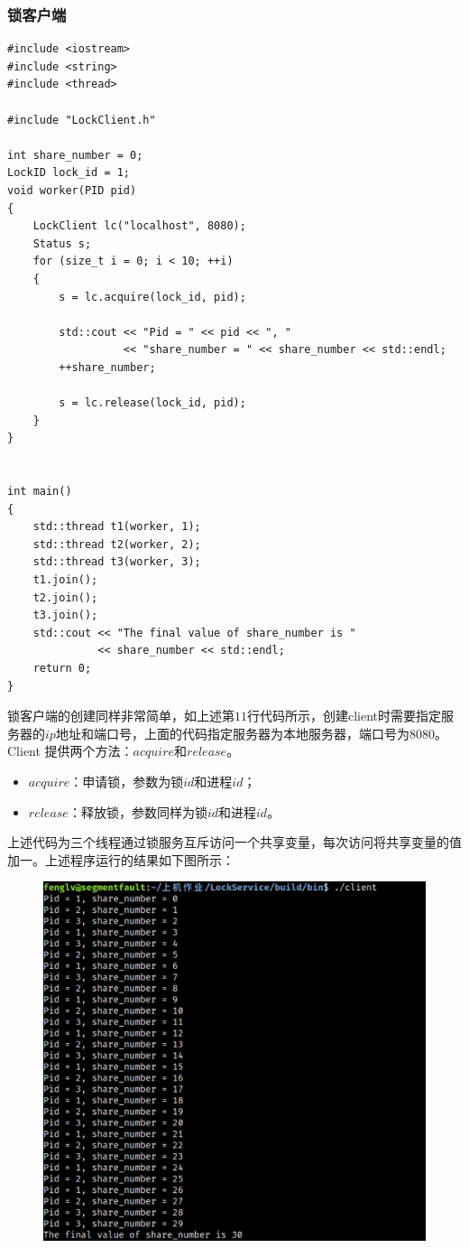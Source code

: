 \documentclass{ctexart}
\begin{document}
\subsubsection{锁客户端}
\begin{lstlisting}
#include <iostream>
#include <string>
#include <thread>

#include "LockClient.h"

int share_number = 0;
LockID lock_id = 1;
void worker(PID pid)
{
    LockClient lc("localhost", 8080);
    Status s;
    for (size_t i = 0; i < 10; ++i)
    {
        s = lc.acquire(lock_id, pid);

        std::cout << "Pid = " << pid << ", "
                  << "share_number = " << share_number << std::endl;
        ++share_number;

        s = lc.release(lock_id, pid);
    }
}


int main()
{
    std::thread t1(worker, 1);
    std::thread t2(worker, 2);
    std::thread t3(worker, 3);
    t1.join();
    t2.join();
    t3.join();
    std::cout << "The final value of share_number is " 
              << share_number << std::endl;
    return 0;
}
\end{lstlisting}
锁客户端的创建同样非常简单，如上述第$11$行代码所示，创建client时需要指定服务器的$ip$地址和端口号，上面的代码指定服务器为本地服务器，端口号为$8080$。Client 提供两个方法：$acquire$和$release$。
\begin{itemize}
  \item $acquire$：申请锁，参数为锁$id$和进程$id$；
	\item $release$：释放锁，参数同样为锁$id$和进程$id$。
\end{itemize}
上述代码为三个线程通过锁服务互斥访问一个共享变量，每次访问将共享变量的值加一。上述程序运行的结果如下图所示：
\begin{figure}[H]
  \centering
  \includegraphics[width = \textwidth]{./client.pdf}
\end{figure}
\end{document}

